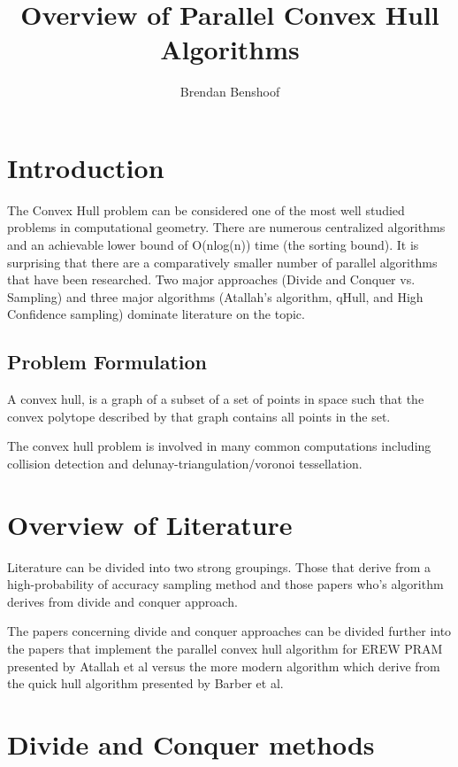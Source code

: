 \documentclass[10pt,a4paper,draft]{report}
\author{Brendan Benshoof}
\title{Overview of Parallel Convex Hull Algorithms}
\begin{document}
\maketitle{}


\section{Introduction}

The Convex Hull problem can be considered one of the most well studied problems in computational geometry. There are numerous centralized algorithms and an achievable lower bound of O(nlog(n)) time (the sorting bound). It is surprising that there are a comparatively smaller number of parallel algorithms that have been researched.
Two major approaches (Divide and Conquer vs. Sampling) and three major algorithms (Atallah's algorithm\cite{Atallah1986Efficient}, qHull, and High Confidence sampling) dominate literature on the topic.
 

\subsection{Problem Formulation}

A convex hull, is a graph of a subset of a set of points in space such that the convex polytope described by that graph contains all points in the set.

The convex hull problem is involved in many common computations including collision detection and delunay-triangulation/voronoi tessellation.


\section{Overview of Literature}

Literature can be divided into two strong groupings. Those that derive from a high-probability of accuracy sampling method and those papers who's algorithm derives from divide and conquer approach.

The papers concerning divide and conquer approaches can be divided further into the papers that implement the parallel convex hull algorithm for EREW PRAM presented by Atallah et al versus the more modern algorithm which derive from the quick hull algorithm presented by Barber et al.


\section{Divide and Conquer methods}
\end{document}
